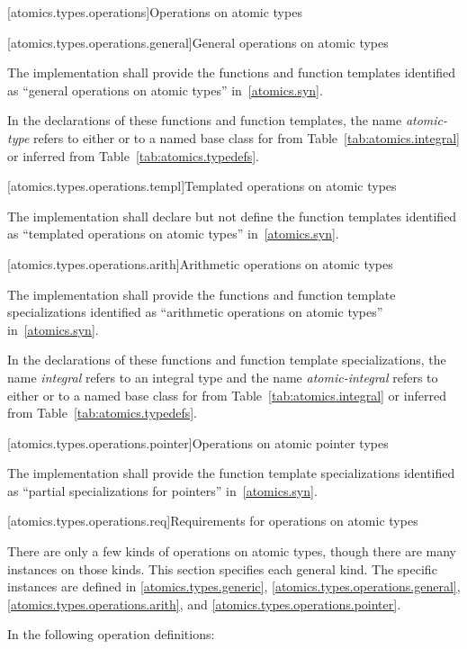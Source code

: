 [atomics.types.operations]{Operations on atomic types}

[atomics.types.operations.general]{General operations on atomic types}

\pnum
The implementation shall provide the functions and function templates identified as ``general operations
on atomic types'' in~\ref{atomics.syn}.

\pnum
In the declarations of these functions and function templates, the name
\textit{atomic-type} refers to either  or to a named base class for 
from Table~\ref{tab:atomics.integral} or inferred from Table~\ref{tab:atomics.typedefs}.

[atomics.types.operations.templ]{Templated operations on atomic types}

\pnum
The implementation shall declare but not define the
function templates identified as ``templated operations on atomic types'' in~\ref{atomics.syn}.

[atomics.types.operations.arith]{Arithmetic operations on atomic types}

\pnum
The implementation shall provide the functions and function template specializations identified as ``arithmetic operations
on atomic types'' in~\ref{atomics.syn}.

\pnum
In the declarations of these functions and function template specializations, the name \textit{integral} refers to an
integral type and the name \textit{atomic-integral} refers to either
 or to a named base class for  from
Table~\ref{tab:atomics.integral} or inferred from Table~\ref{tab:atomics.typedefs}.

[atomics.types.operations.pointer]{Operations on atomic pointer types}

\pnum
The implementation shall provide the function template specializations
identified as ``partial specializations for pointers'' in~\ref{atomics.syn}.

[atomics.types.operations.req]{Requirements for operations on atomic types}

\pnum
There are only a few kinds of operations on atomic types, though there are many
instances on those kinds. This section specifies each general kind. The specific
instances are defined in
\ref{atomics.types.generic}, \ref{atomics.types.operations.general},
\ref{atomics.types.operations.arith}, and \ref{atomics.types.operations.pointer}.

\pnum
In the following operation definitions:

